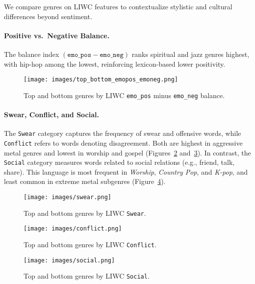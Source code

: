 We compare genres on LIWC features to contextualize stylistic and cultural
differences beyond sentiment.

\paragraph{Positive vs.\ Negative Balance.}
The balance index $(\texttt{emo\_pos} - \texttt{emo\_neg})$ ranks spiritual and jazz genres
highest, with hip-hop among the lowest, reinforcing lexicon-based lower positivity.

\begin{figure}[htbp]
    \centering
    \texttt{[image: images/top\_bottom\_emopos\_emoneg.png]}
    \caption{Top and bottom genres by LIWC \texttt{emo\_pos} minus \texttt{emo\_neg} balance.}
    \label{fig:liwc_emopos_emoneg_balance}
\end{figure}

\paragraph{Swear, Conflict, and Social.}


The \texttt{Swear} category captures the frequency of swear and offensive words, while 
\texttt{Conflict} refers to words denoting disagreement. Both are highest in 
aggressive metal genres and lowest in worship and gospel 
(Figures~\ref{fig:liwc_swear} and~\ref{fig:liwc_conflict}). 
In contrast, the \texttt{Social} category measures words related to social relations 
(e.g., friend, talk, share). This language is most frequent in \textit{Worship}, 
\textit{Country Pop}, and \textit{K-pop}, and least common in extreme metal subgenres 
(Figure~\ref{fig:liwc_social}).

\begin{figure}[htbp]
    \centering
    \texttt{[image: images/swear.png]}
    \caption{Top and bottom genres by LIWC \texttt{Swear}.}
    \label{fig:liwc_swear}
\end{figure}

\begin{figure}[htbp]
    \centering
    \texttt{[image: images/conflict.png]}
    \caption{Top and bottom genres by LIWC \texttt{Conflict}.}
    \label{fig:liwc_conflict}
\end{figure}

\begin{figure}[htbp]
    \centering
    \texttt{[image: images/social.png]}
    \caption{Top and bottom genres by LIWC \texttt{Social}.}
    \label{fig:liwc_social}
\end{figure}

